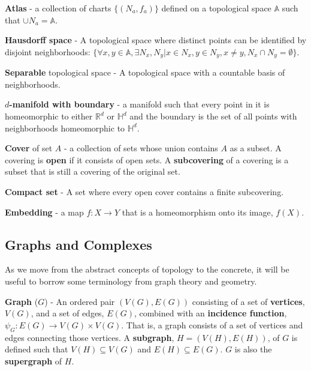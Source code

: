 \begin{defn}
  \textbf{Atlas} - a collection of charts $\{(N_a,f_a)\}$ defined on a
  topological space $\mathbb{A}$ such that $\cup N_a = \mathbb{A}$.
\end{defn}

\begin{defn}
  \textbf{Hausdorff space} - A topological space where distinct points can
  be identified by disjoint neighborhoods: $\{\forall x,y \in \mathbb{A},
  \exists N_x,N_y | x \in N_x, y \in N_y, x \neq y, N_x \cap N_y = \emptyset\}$.
\end{defn}
\begin{defn}
  \textbf{Separable} topological space - A topological space with a countable
  basis of neighborhoods.
\end{defn}
\begin{defn}
  \textbf{$d$-manifold with boundary} - a manifold such that every point in
  it is homeomorphic to either $\mathbb{R}^d$ or $\mathbb{H}^d$ and the boundary
  is the set of all points with neighborhoods homeomorphic to $\mathbb{H}^d$.
\end{defn}
\begin{defn}
  \textbf{Cover} of set $A$ - a collection of sets whose union contains $A$
  as a subset. A covering is \textbf{open} if it consists of open sets. A
  \textbf{subcovering} of a covering is a subset that is still a covering of the
  original set.
\end{defn}

\begin{defn}
  \textbf{Compact set} - A set where every open cover contains a finite
  subcovering.
\end{defn}

\begin{defn}
  \textbf{Embedding} - a map $f : X \rightarrow Y$ that is a homeomorphism onto
  its image, $f(X)$.
\end{defn}

\subsection{Graphs and Complexes}

As we move from the abstract concepts of topology to the concrete, it will be useful to borrow some terminology from graph theory and geometry.

\begin{defn}
  \textbf{Graph} ($G$) - An ordered pair $(V(G),E(G))$ consisting of a set of
  \textbf{vertices}, $V(G)$, and a set of edges, $E(G)$, combined with an
  \textbf{incidence function}, $\psi_G : E(G) \rightarrow V(G) \times V(G)$.
  That is, a graph consists of a set of vertices and edges connecting those
  vertices. A \textbf{subgraph}, $H = (V(H),E(H))$, of $G$ is defined such that
  $V(H) \subseteq V(G)$ and $E(H) \subseteq E(G)$. $G$ is also the
  \textbf{supergraph} of $H$.
\end{defn}

